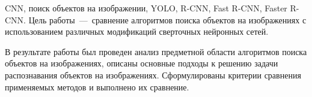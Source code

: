\begin{essay}{CNN, поиск объектов на изображении, YOLO, R-CNN, Fast R-CNN, Faster R-CNN.}
	Цель работы~---~сравнение алгоритмов поиска объектов на изображениях с использованием различных модификаций сверточных нейронных сетей.
	
	В результате работы был проведен анализ предметной области алгоритмов поиска объектов на изображениях, описаны основные подходы к решению задачи распознавания объектов на изображениях.
	Сформулированы критерии сравнения применяемых методов и выполнено их сравнение.
\end{essay}